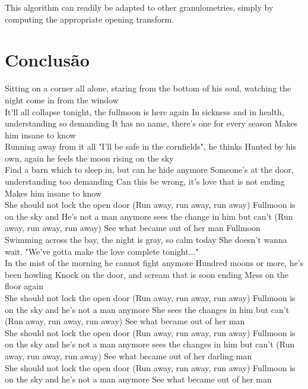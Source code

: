 \documentclass{sciposter}
\begin{document}
\begin{multicols}{3}
This algorithm can 
readily be adapted to other granulometries, simply by computing the 
appropriate opening transform.



\section{Conclusão}

Sitting on a corner all alone,
staring from the bottom of his soul,
watching the night come in from the window
\\
It'll all collapse tonight, the fullmoon is here again
In sickness and in health, understanding so demanding
It has no name, there's one for every season
Makes him insane to know
\\
Running away from it all
"I'll be safe in the cornfields", he thinks
Hunted by his own,
again he feels the moon rising on the sky
\\
Find a barn which to sleep in, but can he hide anymore
Someone's at the door, understanding too demanding
Can this be wrong, it's love that is not ending
Makes him insane to know
\\
She should not lock the open door
(Run away, run away, run away)
Fullmoon is on the sky and He's not a man anymore
sees the change in him but can't
(Run away, run away, run away)
See what became out of her man
Fullmoon
\\
Swimming across the bay,
the night is gray, so calm today
She doesn't wanna wait.
"We've gotta make the love complete tonight..."
\\
In the mist of the morning he cannot fight anymore
Hundred moons or more, he's been howling
Knock on the door, and scream that is soon ending
Mess on the floor again
\\
She should not lock the open door
(Run away, run away, run away)
Fullmoon is on the sky and he's not a man anymore
She sees the changes in him but can't
(Run away, run away, run away)
See what became out of her man
\\
She should not lock the open door
(Run away, run away, run away)
Fullmoon is on the sky and he's not a man anymore
sees the changes in him but can't
(Run away, run away, run away)
See what became out of her darling man
\\
She should not lock the open door
(Run away, run away, run away)
Fullmoon is on the sky and he's not a man anymore
See what became out of her man
 


\end{multicols}
\end{document}
